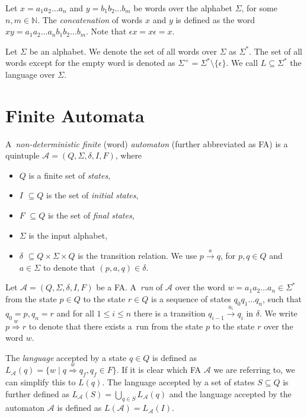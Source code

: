 Let $x = a_1a_2\ldots a_n$ and $y = b_1b_2\ldots b_m$ be words over the alphabet
$\Sigma$, for some $n, m \in \mathbb{N}$. The \emph{concatenation} of words $x$
and $y$ is defined as the word $xy = a_1a_2\ldots a_nb_1b_2\ldots b_m$. Note
that $\epsilon x = x \epsilon = x$.

Let $\Sigma$ be an alphabet. We denote the set of all words over $\Sigma$ as
$\Sigma^*$. The set of all words except for the empty word is denoted as
$\Sigma^+ = \Sigma^* \setminus \{\epsilon\}$. We call $L \subseteq \Sigma^*$ the
language over $\Sigma$.

 \section{Finite Automata}

 A~\emph{non-deterministic finite} (word) \emph{automaton} (further abbreviated
 as FA) is a quintuple $\mathcal{A} = (Q, \Sigma, \delta, I, F)$, where
  \begin{itemize}
\item $Q$ is a finite set of \emph{states}, \item $I$ $ \subseteq Q$ is the set
of \emph{initial states}, \item $F$ $ \subseteq Q$ is the set of \emph{final
states}, \item $\Sigma$ is the input alphabet, \item $\delta$ $ \subseteq Q
\times\Sigma\times Q$ is the transition relation. We use $p
\overset{a}{\longrightarrow} q$, for $p, q \in Q$ and $a \in \Sigma$ to denote
that $(p, a, q) \in \delta$.
	\end{itemize}
	
Let $\mathcal{A} = (Q, \Sigma, \delta, I, F)$ be a FA. A~\emph{run} of
$\mathcal{A}$ over the word $w = a_1a_2\ldots a_n \in \Sigma^*$ from the state
$p \in Q$ to the state $r \in Q$ is a sequence of states $q_0q_1\ldots q_n$,
such that $q_0 = p, q_n = r$ and for all $1 \leq i \leq n$ there is a transition
$q_{i-1} \overset{a_i}{\longrightarrow} q_i$ in $\delta$. We write $p
\overset{w}{\Longrightarrow} r$ to denote that there exists a~run from the state
$p$ to the state $r$ over the word $w$.
	
The \emph{language} accepted by a state $q \in Q$ is defined as
$L_{\mathcal{A}}(q) = \{w \mid q \overset{w}{\Longrightarrow} q_f, q_f \in F\}$.
If it is clear which FA $\mathcal{A}$ we are referring to, we can simplify
this to $L(q)$. The language accepted by a set of states $S \subseteq
Q$ is further defined as $L_{\mathcal{A}}(S) = \bigcup_{q \in S}
L_{\mathcal{A}}(q)$ and the language accepted by the automaton $\mathcal{A}$ is
defined as $L(\mathcal{A}) = L_{\mathcal{A}}(I)$.
	
